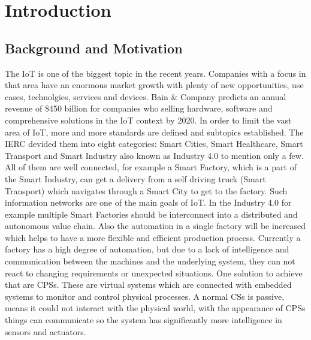 \chapter{Introduction}

\section{Background and Motivation}

The \ac{IoT} is one of the biggest topic in the recent years.
Companies with a focus in that area have an enormous market growth with plenty of new opportunities, use cases, technolgies, services and devices.
Bain \& Company predicts an annual revenue of \$450 billion for companies who selling hardware, software and comprehensive solutions in the \ac{IoT} context by 2020.\cite{Bosche:2016}
In order to limit the vast area of \ac{IoT}, more and more standards are defined and subtopics established.
The \ac{IERC} devided them into eight categories: Smart Cities, Smart Healthcare, Smart Transport and Smart Industry also known as Industry 4.0 to mention only a few.
All of them are well connected, for example a Smart Factory, which is a part of the Smart Industry, can get a delivery from a self driving truck (Smart Transport) which navigates through a Smart City to get to the factory.
Such information networks are one of the main goals of \ac{IoT}.
In the Industry 4.0 for example multiple Smart Factories should be interconnect into a distributed and autonomous value chain.
Also the automation in a single factory will be increased which helps to have a more flexible and efficient production process.
Currently a factory has a high degree of automation, but due to a lack of intelligence and communication between the machines and the underlying system, they can not react to changing requirements or unexpected situations.
One solution to achieve that are \acp{CPS}.
These are virtual systems which are connected with embedded systems to monitor and control physical processes.\cite{Lee:2008}
A normal \acp{CS} is passive, means it could not interact with the physical world, with the appearance of \acp{CPS} things can communicate so the system has significantly more intelligence in sensors and actuators.\cite{Poovendran:2010}

